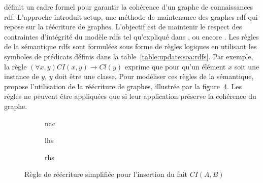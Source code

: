 \cite{chabinUsingGraphGrammar2019,chabinGraphRewritingSystem2020} définit un cadre formel pour garantir la cohérence d'un graphe de connaissances \gls{rdf}.
L'approche introduit \gls{setup}, une méthode de maintenance des graphes \gls{rdf} qui repose sur la réécriture de graphes.
L'objectif est de maintenir le respect des contraintes d'intégrité du modèle \gls{rdfs} tel qu'expliqué dans \cite{flourisFormalFoundationsRDF2013}, \cite{halfeld-ferrariRDFUpdatesConstraints2017} ou encore \cite{chabinConsistentUpdatingDatabases2020}.
Les règles de la sémantique \gls{rdfs} sont formulées sous forme de règles logiques en utilisant les symboles de prédicats définis dans la table~\ref{table:update:soa:rdfs}.
Par exemple, la règle $(\forall x,y) CI(x,y) \to Cl(y)$ exprime que pour qu'un élément $x$ soit une instance de $y$, $y$ doit être une classe.
Pour modéliser ces règles de la sémantique, \cite{chabinUsingGraphGrammar2019} propose l'utilisation de la réécriture de graphes, illustrée par la figure~\ref{fig:gram_rule}.
Les règles ne peuvent être appliquées que si leur application préserve la cohérence du graphe.

\begin{figure}[htb]
    \centering
    \begin{subfigure}[b]{.3\textwidth}
        \centering
        \caption{\acs{nac}}
        \label{fig:gram_rule:nac}
    \end{subfigure}
    \begin{subfigure}[b]{.3\textwidth}
        \centering
        \caption{\acs{lhs}}
        \label{fig:gram_rule:lhs}
    \end{subfigure}
    \begin{subfigure}[b]{.3\textwidth}
        \centering
        \caption{\acs{rhs}}
        \label{fig:gram_rule:rhs}
    \end{subfigure}
    \caption{Règle de réécriture simplifiée pour l'insertion du fait $CI(A,B)$}
    \label{fig:gram_rule}
\end{figure}

